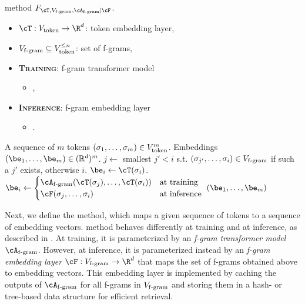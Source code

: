 \begin{algorithm}[t]
\caption{\SCONE method $F_{\cT, \Vfgram, \train{\Afgram} | \infer{\cF}}$.}
\label{alg:scone-first-stage}
\begin{algorithmic}
\begin{itemize}[itemsep=-2pt]
    \item $\cT : \Vtoken \to \R^d$: token embedding layer,
    \item $V_{\mathrm{f\text{-}gram}} \subseteq V_{\mathrm{token}}^{\le n}$: set of f-grams,
    \item \textbf{\textsc{Training}}: f-gram transformer model
    \begin{itemize}[leftmargin=8mm,label=$\triangleright$,itemsep=-3pt,topsep=-4pt]
        \item {},
    \end{itemize}
    \item \textbf{\textsc{Inference}}: f-gram embedding layer
    \begin{itemize}[leftmargin=8mm,label=$\triangleright$,itemsep=-3pt,topsep=-4pt]
        \item {}.
    \end{itemize}
\end{itemize}
 A sequence of $m$ tokens $(\sigma_1, \ldots, \sigma_m) \in V_{\mathrm{token}}^m$.
 Embeddings $(\be_1, \ldots, \be_m) \in (\mathbb{R}^d)^m$.
    \STATE $j \gets$ smallest $j' < i$ s.t. $(\sigma_{j'}, \ldots, \sigma_i) \in V_{\mathrm{f\text{-}gram}}$ if such a $j'$ exists, otherwise $i$.
        \STATE $\be_i \gets \cT(\sigma_i)$.
    \ELSE
        \STATE $\be_i \gets \begin{cases}
            \Afgram(\cT(\sigma_{j}), \ldots, \cT(\sigma_i)) & \text{at training}\\
            \cF(\sigma_{j}, \ldots, \sigma_i) & \text{at inference}
        \end{cases}$
    \ENDIF
\ENDFOR
\RETURN $(\be_1, \ldots, \be_m)$
\end{algorithmic}
\end{algorithm}


Next, we define the \SCONE method, which maps a given sequence of tokens to a sequence of embedding vectors. \SCONE method behaves differently at training and at inference, as described in . At training, it is parameterized by an {\em f-gram transformer model} $\Afgram$. However, at inference, it is parameterized instead by an {\em f-gram embedding layer} $\cF : \Vfgram \to \R^d$ that maps the set of f-grams obtained above to embedding vectors. This embedding layer is implemented by caching the outputs of $\Afgram$ for all f-grams in $V_{\mathrm{f\text{-}gram}}$ and storing them in a hash- or tree-based data structure for efficient retrieval.





